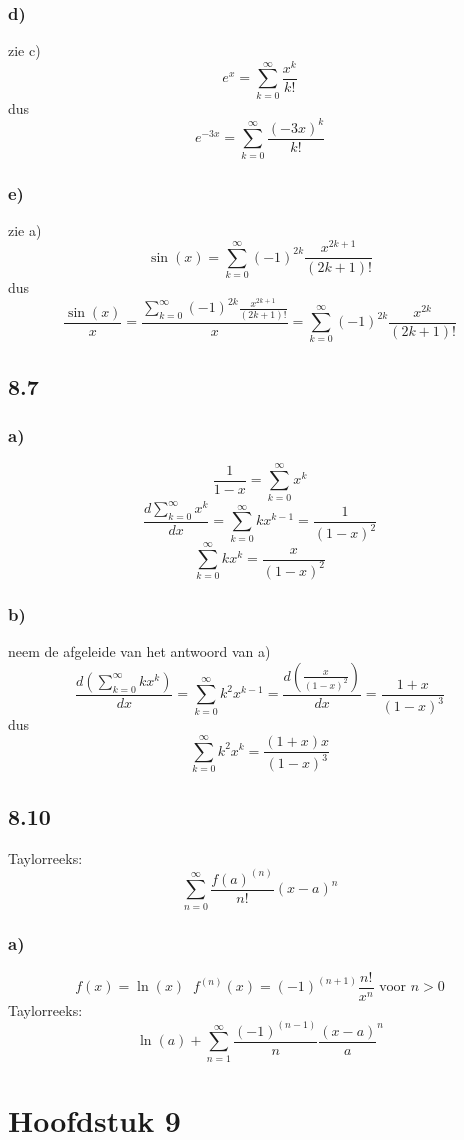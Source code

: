 \documentclass[11pt]{article}
\begin{document}
\subsubsection*{d)}
zie c)
\[
e^x = \sum_{k=0}^\infty\frac{x^k}{k!}
\]
dus
\[
e^{-3x} = \sum_{k=0}^\infty\frac{(-3x)^k}{k!}
\]

\subsubsection*{e)}
zie a)
\[
\sin(x) = \sum_{k=0}^\infty(-1)^{2k}\frac{x^{2k+1}}{(2k+1)!}
\]
dus
\[
\frac{\sin(x)}{x} = \frac{\sum_{k=0}^\infty(-1)^{2k}\frac{x^{2k+1}}{(2k+1)!}}{x}
=
\sum_{k=0}^\infty(-1)^{2k}\frac{x^{2k}}{(2k+1)!}
\]

\subsection*{8.7}
\subsubsection*{a)}
\[
\frac{1}{1-x} = \sum_{k=0}^\infty x^k
\]
\[
\frac{d\sum_{k=0}^\infty x^k}{dx} = \sum_{k=0}^\infty kx^{k-1}
= \frac{1}{(1-x)^2}
\]
\[
\sum_{k=0}^\infty kx^{k} = \frac{x}{(1-x)^2} 
\]

\subsubsection*{b)}
neem de afgeleide van het antwoord van a)
\[
\frac{d(\sum_{k=0}^\infty kx^{k})}{dx}
=
\sum_{k=0}^\infty k^2x^{k-1}
=
\frac{d(\frac{x}{(1-x)^2})}{dx}
=
\frac{1+x}{(1-x)^3}
\]
dus
\[
\sum_{k=0}^\infty k^2x^{k}
=
\frac{(1+x)x}{(1-x)^3}
\]

\subsection*{8.10}
Taylorreeks:
\[
\sum_{n=0}^\infty\frac{f(a)^{(n)}}{n!}(x-a)^n
\]

\subsubsection*{a)}
\[
f(x) = \ln(x) \;\; f^{(n)}(x) = (-1)^{(n+1)} \frac{n!}{x^n} \text{ voor } n>0
\]
Taylorreeks:
\[
\ln(a) + \sum_{n=1}^\infty\frac{(-1)^{(n-1)}}{n}\frac{(x-a)}{a}^n
\]

\section*{Hoofdstuk 9}
\end{document}
